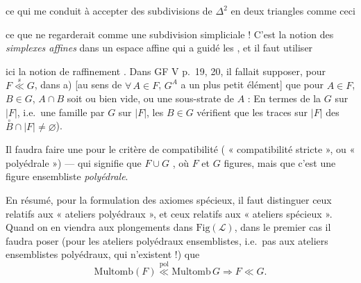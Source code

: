\documentclass[11pt,a4paper]{article}
\begin{document}
ce qui me conduit à accepter des subdivisions de $\Delta^{2}$ en deux triangles comme ceci

ce que  ne regarderait comme une subdivision simpliciale ! C'est la notion des \emph{simplexes affines} dans un espace affine qui a guidé les , et il faut utiliser

ici la notion de raffinement \emph{\ill{}}. Dans GF V p.\ 19, 20, il fallait supposer, \struck{\ill{}} pour $F \overset{s}{\ll} G$, dans a)  [au sens de $\forall\, A \in F$, $G^{A}$ a un plus petit élément] que pour $A \in F$, $B \in G$, $A \cap B$ soit ou bien vide, ou une  sous-strate de $A$ : En termes de la \ill{} $G$ sur $|F|$, i.e.\ une famille  par $G$ sur $|F|$, les $B \in G$ \ill{} vérifient que les traces sur $|F|$ des \ill{} $\overset{\circ}{B} \cap |F| \neq \varnothing$). 

Il faudra faire une  \ill{}  pour le critère de compatibilité (\ill{} « compatibilité stricte », ou « polyédrale ») — qui signifie que \ill{} $F \cup G$ ,  où $F$ et $G$ \ill{} \ill{} figures, mais que c'est une figure ensembliste \emph{polyédrale}.

En résumé,  pour la formulation des axiomes spécieux, il faut distinguer  ceux relatifs aux « ateliers polyédraux », et ceux relatifs aux « ateliers spécieux ». Quand on en viendra aux plongements dans $\mathrm{Fig}(\mathcal{L})$, dans le premier cas il faudra poser (pour les ateliers polyédraux ensemblistes, i.e.\ pas \ill{}  aux ateliers ensemblistes polyédraux, qui n'existent  !) que
\[
  \mathrm{Multomb}(F) \overset{\mathrm{pol}}{\ll} \mathrm{Multomb}\, G \Longrightarrow F \ll G .
\]

\end{document}
